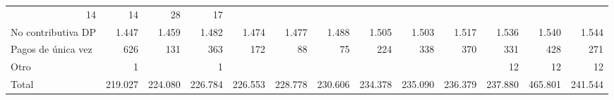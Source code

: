 \begin{tabular}{lllllllllllll}
  \multicolumn{1}{r}{14} &
  \multicolumn{1}{r}{14} &
  \multicolumn{1}{r}{28} &
  \multicolumn{1}{r}{17} \\
\multicolumn{1}{l}{\hspace{1em}No contributiva DP} &
  \multicolumn{1}{|r}{1.447} &
  \multicolumn{1}{r}{1.459} &
  \multicolumn{1}{r}{1.482} &
  \multicolumn{1}{r}{1.474} &
  \multicolumn{1}{r}{1.477} &
  \multicolumn{1}{r}{1.488} &
  \multicolumn{1}{r}{1.505} &
  \multicolumn{1}{r}{1.503} &
  \multicolumn{1}{r}{1.517} &
  \multicolumn{1}{r}{1.536} &
  \multicolumn{1}{r}{1.540} &
  \multicolumn{1}{r}{1.544} \\
\multicolumn{1}{l}{\hspace{1em}Pagos de única vez} &
  \multicolumn{1}{|r}{626} &
  \multicolumn{1}{r}{131} &
  \multicolumn{1}{r}{363} &
  \multicolumn{1}{r}{172} &
  \multicolumn{1}{r}{88} &
  \multicolumn{1}{r}{75} &
  \multicolumn{1}{r}{224} &
  \multicolumn{1}{r}{338} &
  \multicolumn{1}{r}{370} &
  \multicolumn{1}{r}{331} &
  \multicolumn{1}{r}{428} &
  \multicolumn{1}{r}{271} \\
\multicolumn{1}{l}{\hspace{1em}Otro} &
  \multicolumn{1}{|r}{1} &
  \multicolumn{1}{r}{} &
  \multicolumn{1}{r}{1} &
  \multicolumn{1}{r}{} &
  \multicolumn{1}{r}{} &
  \multicolumn{1}{r}{} &
  \multicolumn{1}{r}{} &
  \multicolumn{1}{r}{} &
  \multicolumn{1}{r}{} &
  \multicolumn{1}{r}{12} &
  \multicolumn{1}{r}{12} &
  \multicolumn{1}{r}{12} \\
\multicolumn{1}{l}{\hspace{1em}Total} &
  \multicolumn{1}{|r}{219.027} &
  \multicolumn{1}{r}{224.080} &
  \multicolumn{1}{r}{226.784} &
  \multicolumn{1}{r}{226.553} &
  \multicolumn{1}{r}{228.778} &
  \multicolumn{1}{r}{230.606} &
  \multicolumn{1}{r}{234.378} &
  \multicolumn{1}{r}{235.090} &
  \multicolumn{1}{r}{236.379} &
  \multicolumn{1}{r}{237.880} &
  \multicolumn{1}{r}{465.801} &
  \multicolumn{1}{r}{241.544} \\
\cline{1-13}
\end{tabular}
